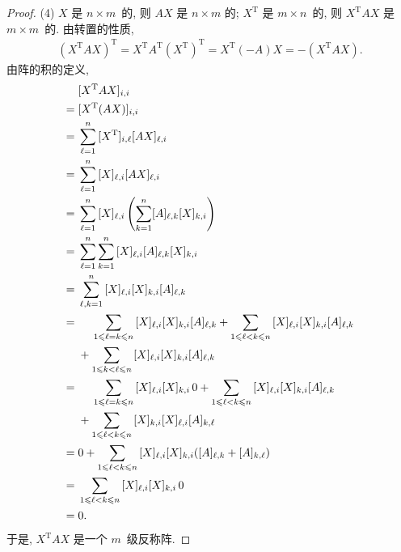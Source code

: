 \begin{proof}
    (4)
    \(X\) 是 \(n \times m\)~的, 则 \(AX\) 是 \(n \times m\) 的;
    \(X^{\mathrm{T}}\) 是 \(m \times n\)~的,
    则 \(X^{\mathrm{T}} A X\) 是 \(m \times m\)~的.
    由转置的性质,
    \begin{align*}
        (X^{\mathrm{T}} A X)^{\mathrm{T}}
        = X^{\mathrm{T}} A^{\mathrm{T}} (X^{\mathrm{T}})^{\mathrm{T}}
        = X^{\mathrm{T}} (-A) X
        = -(X^{\mathrm{T}} A X).
    \end{align*}
    由阵的积的定义,
    \begin{align*}
             &
        [X^{\mathrm{T}} A X]_{i,i}
        \\
        = {} &
        [X^{\mathrm{T}} (A X)]_{i,i}
        \\
        = {} &
        \sum_{\ell = 1}^{n}
        {[X^{\mathrm{T}}]_{i,\ell} [A X]_{\ell,i}}
        \\
        = {} &
        \sum_{\ell = 1}^{n}
        {[X]_{\ell,i} [A X]_{\ell,i}}
        \\
        = {} &
        \sum_{\ell = 1}^{n}
        {
        [X]_{\ell,i}
        \left(\sum_{k = 1}^{n} [A]_{\ell,k} [X]_{k,i}\right)
        }
        \\
        = {} &
        \sum_{\ell = 1}^{n}
        \sum_{k = 1}^{n}
        {[X]_{\ell,i} [A]_{\ell,k} [X]_{k,i}}
        \\
        = {} &
        \sum_{\ell, k = 1}^{n}
        {[X]_{\ell,i} [X]_{k,i} [A]_{\ell,k}}
        \\
        = {} & \hphantom{{} + {}}
        \sum_{1 \leq \ell = k \leq n}
        {[X]_{\ell,i} [X]_{k,i} [A]_{\ell,k}}
        +
        \sum_{1 \leq \ell < k \leq n}
        {[X]_{\ell,i} [X]_{k,i} [A]_{\ell,k}}
        \\
             & +
        \sum_{1 \leq k < \ell \leq n}
        {[X]_{\ell,i} [X]_{k,i} [A]_{\ell,k}}
        \\
        = {} & \hphantom{{} + {}}
        \sum_{1 \leq \ell = k \leq n}
        {[X]_{\ell,i} [X]_{k,i}\, 0}
        +
        \sum_{1 \leq \ell < k \leq n}
        {[X]_{\ell,i} [X]_{k,i} [A]_{\ell,k}}
        \\
             & +
        \sum_{1 \leq \ell < k \leq n}
        {[X]_{k,i} [X]_{\ell,i} [A]_{k,\ell}}
        \\
        = {} &
        0 +
        \sum_{1 \leq \ell < k \leq n}
        {[X]_{\ell,i} [X]_{k,i} ([A]_{\ell,k} + [A]_{k,\ell})}
        \\
        = {} &
        \sum_{1 \leq \ell < k \leq n}
        {[X]_{\ell,i} [X]_{k,i}\, 0}
        \\
        = {} &
        0.
    \end{align*}
    于是, \(X^{\mathrm{T}} A X\) 是一个 \(m\)~级反称阵.
\end{proof}

